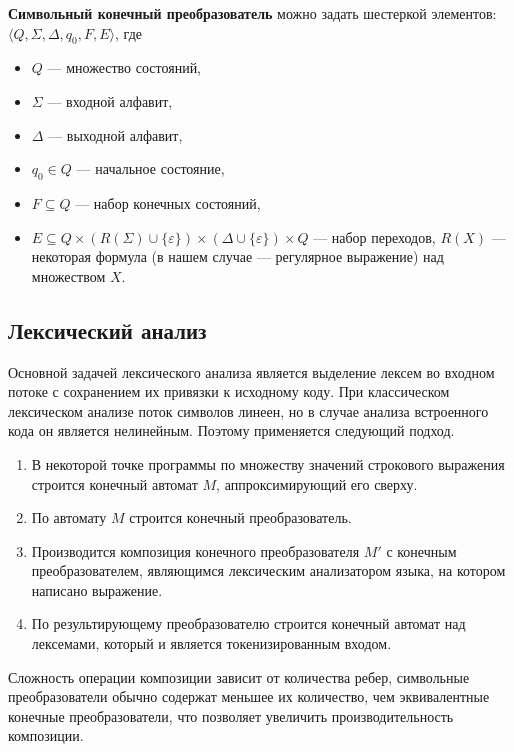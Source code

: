 \textbf{Символьный конечный преобразователь} можно задать шестеркой элементов: 
$\langle Q, \Sigma, \Delta, q_0, F, E \rangle$, где

\begin{itemize}
\item $Q$ --- множество состояний, 
\item $\Sigma$ --- входной алфавит, 
\item $\Delta$ --- выходной алфавит, 
\item $q_0 \in Q$ --- начальное состояние, 
\item $F \subseteq Q$ --- набор конечных состояний, 
\item $E \subseteq Q \times (R(\Sigma) \cup \{\varepsilon\}) \times (\Delta \cup \{\varepsilon\})  \times Q$ --- набор переходов, $R(X)$ --- некоторая формула (в нашем случае --- регулярное выражение) над множеством $X$.
\end{itemize}

\subsection{Лексический анализ}
Основной задачей лексического анализа является выделение лексем во входном потоке с сохранением их привязки к исходному коду. При классическом лексическом анализе поток символов линеен, но в случае анализа встроенного кода он является нелинейным. Поэтому применяется следующий подход.

\begin{enumerate}
\item В некоторой точке программы по множеству значений строкового выражения строится конечный автомат $M$, аппроксимирующий его сверху.
\item По автомату $M$ строится конечный преобразователь.
\item Производится композиция конечного преобразователя $M'$ с конечным преобразователем, являющимся лексическим анализатором языка, на котором написано выражение.
\item По результирующему преобразователю строится конечный автомат над лексемами, который и является токенизированным входом.
\end{enumerate}

Сложность операции композиции зависит от количества ребер, символьные преобразователи обычно содержат меньшее их количество, чем эквивалентные конечные преобразователи, что позволяет увеличить производительность композиции.

